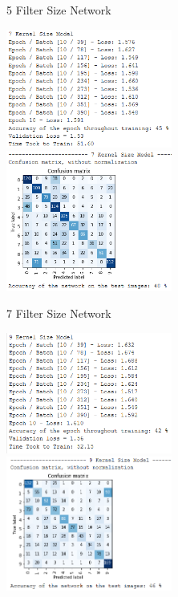 \documentclass{article}
\begin{document}
\begin{figure}[h!]
\begin{subfigure}[t]{0.45\textwidth}
            \caption{5 Filter Size Network}
        \end{subfigure}
        \begin{subfigure}[t]{0.45\textwidth}
            \centering
            \includegraphics[width=0.6\textwidth]{7KS_train}
            \includegraphics[width=0.6\textwidth]{7KS_cm}
            \caption{7 Filter Size Network}
        \end{subfigure}
        \begin{subfigure}[t]{0.45\textwidth}
            \centering
            \includegraphics[width=0.6\textwidth]{9KS_train}
            \includegraphics[width=0.6\textwidth]{9KS_cm}

\end{subfigure}
\end{figure}
\end{document}

